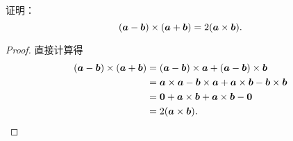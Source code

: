 \begin{example}
证明：\begin{equation*}
	(\boldsymbol{a}-\boldsymbol{b})\times(\boldsymbol{a}+\boldsymbol{b})
	= 2(\boldsymbol{a}\times\boldsymbol{b}).
\end{equation*}
\begin{proof}
直接计算得\begin{align*}
	(\boldsymbol{a}-\boldsymbol{b})\times(\boldsymbol{a}+\boldsymbol{b})
	&= (\boldsymbol{a}-\boldsymbol{b})\times\boldsymbol{a}
		+ (\boldsymbol{a}-\boldsymbol{b})\times\boldsymbol{b} \\
	&= \boldsymbol{a}\times\boldsymbol{a}-\boldsymbol{b}\times\boldsymbol{a}
	+ \boldsymbol{a}\times\boldsymbol{b}-\boldsymbol{b}\times\boldsymbol{b} \\
	&= \boldsymbol{0}+\boldsymbol{a}\times\boldsymbol{b}
	+ \boldsymbol{a}\times\boldsymbol{b}-\boldsymbol{0} \\
	&= 2(\boldsymbol{a}\times\boldsymbol{b}).
	\qedhere
\end{align*}
\end{proof}
\end{example}
